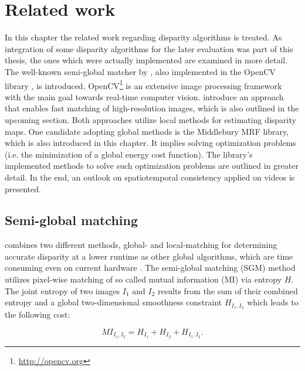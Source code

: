 \chapter{Related work}
\label{chap:related}

In this chapter the related work regarding disparity algorithms is treated.
As integration of some disparity algorithms for the later evaluation was part of this thesis, the ones which were actually implemented are examined in more detail.
The well-known semi-global matcher by \citeauthor{hirschmuller2005accurate}, also implemented in the OpenCV library \citep{opencv_library}, is introduced.
OpenCV\footnote{\url{http://opencv.org}} is an extensive image processing framework with the main goal towards real-time computer vision.
\citeauthor{Geiger2010ACCV} introduce an approach that enables fast matching of high-resolution images, which is also outlined in the upcoming section.
Both approaches utilize local methods for estimating disparity maps.
One candidate adopting global methods is the Middlebury MRF library, which is also introduced in this chapter.
It implies solving optimization problems (i.e. the minimization of a global energy cost function).
The library’s implemented methods to solve such optimization problems are outlined in greater detail.
In the end, an outlook on spatiotemporal consistency applied on videos is presented.

\section{Semi-global matching}

\citeauthor{hirschmuller2005accurate} combines two different methods, global- and local-matching for determining accurate disparity at a lower runtime as other global algorithms,  which are time consuming even on current hardware \citep{hirschmuller2005accurate, hirschmuller2008stereo}.
\newline\newline\noindent The semi-global matching (SGM) method utilizes pixel-wise matching of so called mutual information (MI) via entropy $H$.
The joint entropy of two images $I_1$ and $I_2$ results from the sum of their combined entropy and a global two-dimensional smoothness constraint $H_{I_1,I_2}$ which leads to the following cost:

\begin{equation}
  MI_{I_1,I_2} = H_{I_1} + H_{I_2} + H_{I_1,I_2}.
\end{equation}

